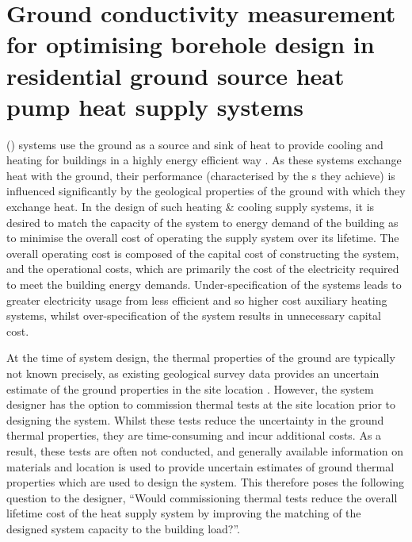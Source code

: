 \section[\glsxtrshort{gshp} borehole design]{Ground conductivity measurement for optimising borehole design in residential ground source heat pump heat supply systems} \label{sec:gshp}

 () systems use the ground as a source and sink of heat to provide cooling and heating for buildings in a highly energy efficient way \citep{aresti2018ReviewDesignAspects}. As these systems exchange heat with the ground, their performance (characterised by the s they achieve) is influenced significantly by the geological properties of the ground with which they exchange heat. In the design of such  heating \& cooling supply systems, it is desired to match the capacity of the  system to energy demand of the building as to minimise the overall cost of operating the supply system over its lifetime. The overall operating cost is composed of the capital cost of constructing the system, and the operational costs, which are primarily the cost of the electricity required to meet the building energy demands. Under-specification of the systems leads to greater electricity usage from less efficient and so higher cost auxiliary heating systems, whilst over-specification of the system results in unnecessary capital cost.

At the time of system design, the thermal properties of the ground are typically not known precisely, as existing geological survey data provides an uncertain estimate of the ground properties in the site location \citep{dallasanta2020UpdatedGroundThermal}. However, the system designer has the option to commission thermal tests at the site location prior to designing the  system. Whilst these tests reduce the uncertainty in the ground thermal properties, they are time-consuming and incur additional costs. As a result, these tests are often not conducted, and generally available information on materials and location is used to provide uncertain estimates of ground thermal properties which are used to design the  system. This therefore poses the following question to the designer, ``Would commissioning thermal tests reduce the overall lifetime cost of the  heat supply system by improving the matching of the designed system capacity to the building load?''.\\

